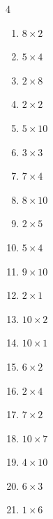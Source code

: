\begin{multicols}{4}
\begin{enumerate}
  \item $8\times 2$
        \phantom{$=16$}

  \item $5\times 4$
        \phantom{$=20$}

  \item $2\times 8$
        \phantom{$=16$}

  \item $2\times 2$
        \phantom{$=4$}

  \item $5\times 10$
        \phantom{$=50$}

  \item $3\times 3$
        \phantom{$=9$}

  \item $7\times 4$
        \phantom{$=28$}

  \item $8\times 10$
        \phantom{$=80$}

  \item $2\times 5$
        \phantom{$=10$}

  \item $5\times 4$
        \phantom{$=20$}

  \item $9\times 10$
        \phantom{$=90$}

  \item $2\times 1$
        \phantom{$=2$}

  \item $10\times 2$
        \phantom{$=20$}

  \item $10\times 1$
        \phantom{$=10$}

  \item $6\times 2$
        \phantom{$=12$}

  \item $2\times 4$
        \phantom{$=8$}

  \item $7\times 2$
        \phantom{$=14$}

  \item $10\times 7$
        \phantom{$=70$}

  \item $4\times 10$
        \phantom{$=40$}

  \item $6\times 3$
        \phantom{$=18$}

  \item $1\times 6$
        \phantom{$=6$}


\end{enumerate}
\end{multicols}
